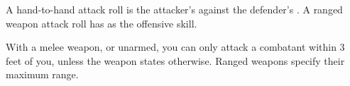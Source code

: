 
A hand-to-hand attack roll is the attacker's  against the defender's  \orr {}. A ranged weapon attack roll has  as the offensive skill.

With a melee weapon, or unarmed, you can only attack a combatant within 3 feet of you, unless the weapon states otherwise. Ranged weapons specify their maximum range.
